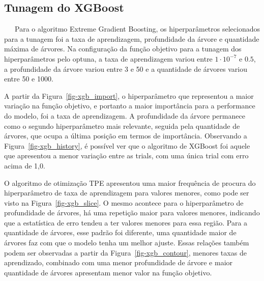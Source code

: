 \documentclass[
  12pt,
  a4paper,
]{scrreprt}
\begin{document}
\subsection{Tunagem do XGBoost}\label{tunagem-do-xgboost}

~~~Para o algoritmo Extreme Gradient Boosting, os hiperparâmetros
selecionados para a tunagem foi a taxa de aprendizagem, profundidade da
árvore e quantidade máxima de árvores. Na configuração da função
objetivo para a tunagem dos hiperparâmetros pelo optuna, a taxa de
aprendizagem variou entre \(1 \cdot 10^{-7}\) e \(0.5\), a profundidade
da árvore variou entre 3 e 50 e a quantidade de árvores variou entre 50
e 1000.

\vspace{12pt}

A partir da Figura~\ref{fig-xgb_import}, o hiperparâmetro que
representou a maior variação na função objetivo, e portanto a maior
importância para a performance do modelo, foi a taxa de aprendizagem. A
profundidade da árvore permanece como o segundo hiperparâmetro mais
relevante, seguida pela quantidade de árvores, que ocupa a última
posição em termos de importância. Observando a
Figura~\ref{fig-xgb_history}, é possível ver que o algoritmo de XGBoost
foi aquele que apresentou a menor variação entre as trials, com uma
única trial com erro acima de 1,0.

\vspace{12pt}

O algoritmo de otimização TPE apresentou uma maior frequência de procura
do hiperparâmetro de taxa de aprendizagem para valores menores, como
pode ser visto na Figura~\ref{fig-xgb_slice}. O mesmo acontece para o
hiperparâmetro de profundidade de árvores, há uma repetição maior para
valores menores, indicando que a estatística de erro tendeu a ter
valores menores para essa região. Para a quantidade de árvores, esse
padrão foi diferente, uma quantidade maior de árvores faz com que o
modelo tenha um melhor ajuste. Essas relações também podem ser
observadas a partir da Figura~\ref{fig-xgb_contour}, menores taxas de
aprendizado, combinado com uma menor profundidade de árvore e maior
quantidade de árvores apresentam menor valor na função objetivo.
\end{document}
